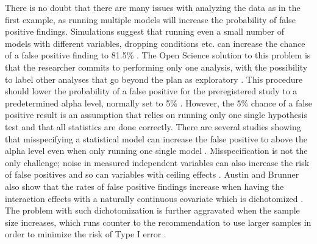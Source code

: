 There is no doubt that there are many issues with analyzing the data as in the first example, as running multiple models will increase the probability of false positive findings. Simulations suggest that running even a small number of models with different variables, dropping conditions etc. can increase the chance of a false positive finding to 81.5\% \citep{Simmons2011}. The Open Science solution to this problem is that the researcher commits to performing only one analysis, with the possibility to label other analyses that go beyond the plan as exploratory \citep{Nosek2018}. This procedure should lower the probability of a false positive for the preregistered study to a predetermined alpha level, normally set to 5\% \citep{Moore2016}. However, the 5\% chance of a false positive result is an assumption that relies on running only one single hypothesis test and that all statistics are done correctly. There are several studies showing that misspecifying a  statistical model can increase the false positive to above the alpha level even when only running one single model \citep{Dennis2019,Litiere2007}. Misspecification is not the only challenge; noise in measured independent variables can also increase the risk of false positives \citep{Brunner2009} and so can variables with ceiling effects \citep{Austin2003}. Austin and Brunner also show that the rates of false positive findings increase when having the interaction effects with a naturally continuous covariate which is dichotomized \citep{Austin2004}. The problem with such dichotomization is further aggravated when the sample size increases, which runs counter to the recommendation to use larger samples in order to minimize the risk of Type I error \citep{Simmons2011}. 
\\
